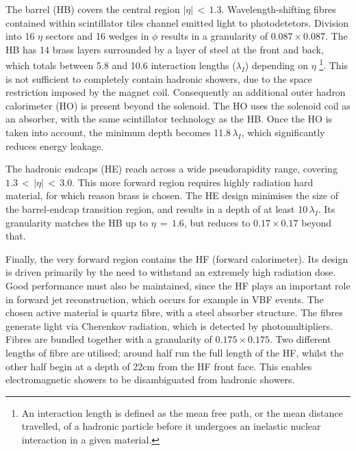 The barrel (HB) covers the central region $|\eta|\,<\,1.3$.
Wavelength-shifting fibres contained within scintillator tiles channel emitted light to photodetetors.
Division into 16 $\eta$ sectors and 16 wedges in $\phi$ results in a granularity of $0.087\times0.087$.
The HB has 14 brass layers surrounded by a layer of steel at the front and back, 
which totals between 5.8 and 10.6 interaction lengths ($\lambda_I$) depending on $\eta$ \footnote{An 
interaction length is defined as the mean free path, or the mean distance travelled, of
a hadronic particle before it undergoes an inelastic nuclear interaction in a given material.}.
This is not sufficient to completely contain hadronic showers, due to the space restriction imposed by the magnet coil.
Consequently an additional outer hadron calorimeter (HO) is present beyond the solenoid.
The HO uses the solenoid coil as an absorber, with the same scintillator technology as the HB.
Once the HO is taken into account, the minimum depth becomes 11.8\,$\lambda_I$, 
which significantly reduces energy leakage. %

The hadronic endcaps (HE) reach across a wide pseudorapidity range, covering $1.3\,<\,|\eta|\,<\,3.0$.
This more forward region requires highly radiation hard material, for which reason brass is chosen. %
The HE design minimises the size of the barrel-endcap transition region, and results in a depth of at least 10\,$\lambda_I$.
Its granularity matches the HB up to $\eta\,=\,1.6$, but reduces to $0.17\times0.17$ beyond that.

Finally, the very forward region contains the HF (forward calorimeter).
Its design is driven primarily by the need to withstand an extremely high radiation dose.
Good performance must also be maintained, since the HF plays an important role in forward jet reconstruction, which occurs for example in VBF \Hgg events.
The chosen active material is quartz fibre, with a steel absorber structure.
The fibres generate light via Cherenkov radiation, which is detected by photomultipliers.
Fibres are bundled together with a granularity of $0.175\times0.175$.
Two different lengths of fibre are utilised; 
around half run the full length of the HF, whilst the other half begin at a depth of 22cm from the HF front face.
This enables electromagnetic showers to be disambiguated from hadronic showers.


